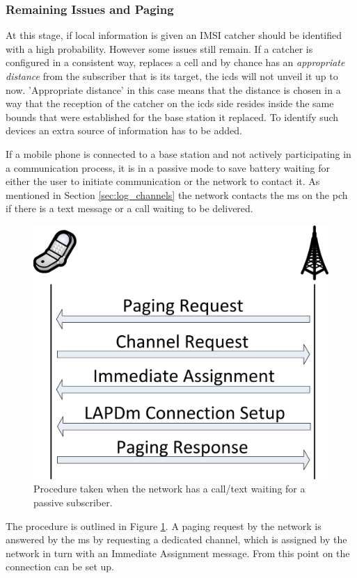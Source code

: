 \subsubsection{Remaining Issues and Paging}
\label{sec:paging}
At this stage, if local information is given an IMSI catcher should be identified with a high probability.
However some issues still remain.
If a catcher is configured in a consistent way, replaces a cell and by chance has an \emph{appropriate distance} from the subscriber that is its target, the \gls{icds} will not unveil it up to now.
'Appropriate distance' in this case means that the distance is chosen in a way that the reception of the catcher on the \gls{icds} side resides inside the same bounds that were established for the base station it replaced.
To identify such devices an extra source of information has to be added.

If a mobile phone is connected to a base station and not actively participating in a communication process, it is in a passive mode to save battery waiting for either the user to initiate communication or the network to contact it.
As mentioned in Section \ref{sec:log_channels} the network contacts the \gls{ms} on the \gls{pch} if there is a text message or a call waiting to be delivered.
\begin{figure}
\centering
\includegraphics{../Images/Paging}
\caption{Procedure taken when the network has a call/text waiting for a passive subscriber.}
\label{fig:paging}
\end{figure}
The procedure is outlined in Figure \ref{fig:paging}.
A paging request by the network is answered by the \gls{ms} by requesting a dedicated channel, which is assigned by the network in turn with an Immediate Assignment message.
From this point on the connection can be set up.

